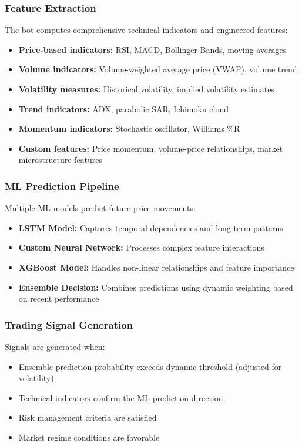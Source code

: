 \documentclass[conference]{IEEEtran}
\begin{document}
\subsubsection{Feature Extraction}
The bot computes comprehensive technical indicators and engineered features:
\begin{itemize}
    \item \textbf{Price-based indicators:} RSI, MACD, Bollinger Bands, moving averages
    \item \textbf{Volume indicators:} Volume-weighted average price (VWAP), volume trend
    \item \textbf{Volatility measures:} Historical volatility, implied volatility estimates
    \item \textbf{Trend indicators:} ADX, parabolic SAR, Ichimoku cloud
    \item \textbf{Momentum indicators:} Stochastic oscillator, Williams \%R
    \item \textbf{Custom features:} Price momentum, volume-price relationships, market microstructure features
\end{itemize}

\subsubsection{ML Prediction Pipeline}
Multiple ML models predict future price movements:
\begin{itemize}
    \item \textbf{LSTM Model:} Captures temporal dependencies and long-term patterns
    \item \textbf{Custom Neural Network:} Processes complex feature interactions
    \item \textbf{XGBoost Model:} Handles non-linear relationships and feature importance
    \item \textbf{Ensemble Decision:} Combines predictions using dynamic weighting based on recent performance
\end{itemize}

\subsubsection{Trading Signal Generation}
Signals are generated when:
\begin{itemize}
    \item Ensemble prediction probability exceeds dynamic threshold (adjusted for volatility)
    \item Technical indicators confirm the ML prediction direction
    \item Risk management criteria are satisfied
    \item Market regime conditions are favorable
\end{itemize}
\end{document}
